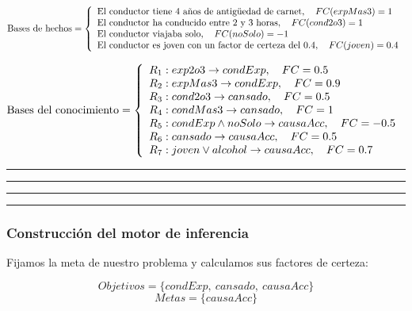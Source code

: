 \documentclass[a4paper,11pt, includehead]{article}
\begin{document}
\vspace{4ex}

\noindent$
\text{Bases de hechos} =
\left\{ 
\begin{array}{l}
	\text{El conductor tiene 4 años de antigüedad de carnet},\quad FC (expMas3)=1 \cr
	\text{El conductor ha conducido entre 2 y 3 horas},\quad FC (cond2o3)=1 \cr
	\text{El conductor viajaba solo},\quad FC (noSolo)=-1 \cr
	\text{El conductor es joven con un factor de certeza del 0.4},\quad FC (joven)=0.4
\end{array} 
\right.
$

\vspace{4ex}

\noindent$
\text{Bases del conocimiento} =
\left\{ 
\begin{array}{l}
	R_1: exp2o3 \rightarrow condExp, \quad FC = 0.5 \cr
	R_2: expMas3 \rightarrow condExp, \quad FC = 0.9 \cr
	R_3: cond2o3 \rightarrow cansado, \quad FC = 0.5 \cr
	R_4: condMas3 \rightarrow cansado, \quad FC = 1 \cr
	R_5: condExp \land noSolo \rightarrow causaAcc, \quad FC = -0.5 \cr
	R_6: cansado \rightarrow causaAcc, \quad FC = 0.5 \cr
	R_7: joven \lor alcohol \rightarrow causaAcc, \quad FC = 0.7
\end{array} 
\right.
$

\vspace{5ex}

\hrule

\hrule

\clearpage

\hrule

\hrule

\vspace{4ex}

\subsubsection{Construcción del motor de inferencia}
\noindent Fijamos la meta de nuestro problema y calculamos sus factores de certeza:

$$Objetivos=\{condExp,\ cansado,\ causaAcc\}$$
$$Metas=\{causaAcc\}$$
\end{document}
